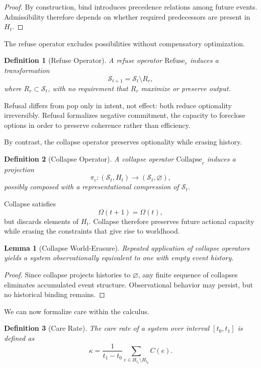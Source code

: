 \documentclass[11pt]{article}
\newtheorem{definition}{Definition}
\newtheorem{lemma}{Lemma}
\theoremstyle{remark}
\begin{document}
\begin{proof}
By construction, bind introduces precedence relations among future events. Admissibility therefore depends on whether required predecessors are present in $H_t$.
\end{proof}

The refuse operator excludes possibilities without compensatory optimization.

\begin{definition}[Refuse Operator]
A refuse operator $\mathrm{Refuse}_r$ induces a transformation
\[
\mathcal{S}_{t+1} = \mathcal{S}_t \setminus R_r,
\]
where $R_r \subset \mathcal{S}_t$, with no requirement that $R_r$ maximize or preserve output.
\end{definition}

Refusal differs from pop only in intent, not effect: both reduce optionality irreversibly. Refusal formalizes negative commitment, the capacity to foreclose options in order to preserve coherence rather than efficiency.

By contrast, the collapse operator preserves optionality while erasing history.

\begin{definition}[Collapse Operator]
A collapse operator $\mathrm{Collapse}_c$ induces a projection
\[
\pi_c : (\mathcal{S}_t, H_t) \rightarrow (\mathcal{S}_t, \varnothing),
\]
possibly composed with a representational compression of $\mathcal{S}_t$.
\end{definition}

Collapse satisfies
\[
\Omega(t+1) = \Omega(t),
\]
but discards elements of $H_t$. Collapse therefore preserves future actional capacity while erasing the constraints that give rise to worldhood.

\begin{lemma}[Collapse World-Erasure]
Repeated application of collapse operators yields a system observationally equivalent to one with empty event history.
\end{lemma}

\begin{proof}
Since collapse projects histories to $\varnothing$, any finite sequence of collapses eliminates accumulated event structure. Observational behavior may persist, but no historical binding remains.
\end{proof}

We can now formalize care within the calculus.

\begin{definition}[Care Rate]
The care rate of a system over interval $[t_0,t_1]$ is defined as
\[
\kappa = \frac{1}{t_1 - t_0} \sum_{e \in H_{t_1} \setminus H_{t_0}} C(e).
\]
\end{definition}
\end{document}
